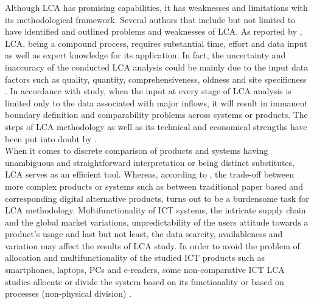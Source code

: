 \documentclass[3p,times,procedia]{elsarticle}
\begin{document}
Although LCA has promising capabilities, it has weaknesses and limitations with its methodological framework. Several authors that include but not limited to \cite{joshi1999product, reap2008survey, owens1997life, finnveden1997valuation, arnold1993life, arnold1995environmental, hermann2007assessing} have identified and outlined problems and weaknesses of LCA. As reported by \cite{hermann2007assessing}, LCA, being a compound process, requires substantial time, effort and data input as well as expert knowledge for its application. In fact, the uncertainty and inaccuracy of the conducted LCA analysis could be mainly due to the input data factors such as quality, quantity, comprehensiveness, oldness  and site specificness \cite{curran2005international, reap2008survey}. In accordance with \cite{joshi1999product} study, when the input at every stage of LCA analysis is limited only to the data associated with major inflows, it will result in immanent boundary definition and comparability problems across systems or products. The steps of LCA methodology as well as its technical and economical strengths have been put into doubt by \cite{finnveden1997valuation, arnold1993life, arnold1995environmental}.\\

When  it  comes  to  discrete  comparison  of  products  and systems having  unambiguous  and  straightforward  interpretation  or  being distinct  substitutes,  LCA  serves  as  an  efficient tool.  Whereas, according  to  \cite{Bull201410, reap2008survey}, the  trade-off  between more complex products or systems such as between traditional  paper  based  and  corresponding  digital  alternative products, turns out to be a burdensome task for LCA methodology. Multifunctionality of  ICT  systems, the  intricate  supply  chain  and  the  global market variations, unpredictability of the users attitude towards a  product’s  usage  and  last  but  not  least,  the  data  scarcity, availableness  and  variation may affect the results of LCA study\cite{guldbrandsson2012opportunities, Bull201410, farrant2012environmental, enroth2009}. In order to avoid the problem of allocation and multifunctionality of the studied ICT products such as smartphones, laptops, PCs and e-readers, some non-comparative ICT LCA studies allocate or divide the system based on its functionality or based on processes (non-physical division) \cite{choi2006life,frey2006ecological,lu2006balancing, ekvall2001allocation}. \\
\end{document}
